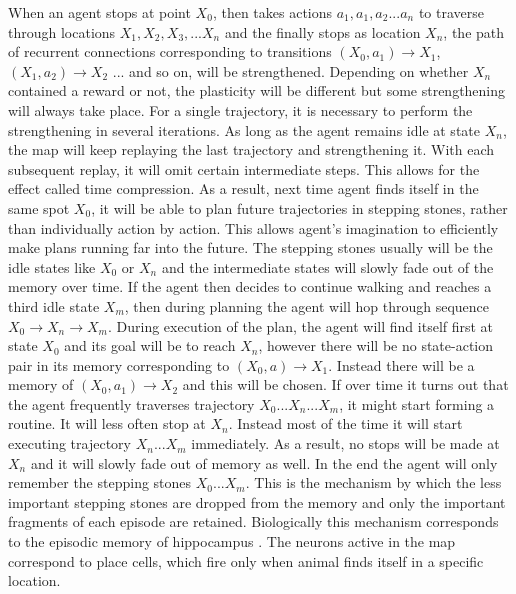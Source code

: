 \documentclass[12pt]{article}
\begin{document}
When an agent stops at point $X_0$, then takes actions $a_1, a_1, a_2... a_n$ to traverse through locations $X_1, X_2, X_3,...X_n$ and the finally stops as location $X_n$, the path of recurrent connections corresponding to transitions  $(X_0,a_1)\rightarrow X_1$, $(X_1,a_2)\rightarrow X_2$ ... and so on, will be strengthened. Depending on whether $X_n$ contained a reward or not, the plasticity will be different but some strengthening will always take place. For a single trajectory, it is necessary to perform the strengthening in several iterations. As long as the agent remains idle at state $X_n$, the map will keep replaying the last trajectory and strengthening it. With each subsequent replay, it will omit certain intermediate steps. This allows for the effect called time compression. As a result, next time agent finds itself in the same spot $X_0$, it will be able to plan future trajectories in stepping stones, rather than individually  action by action. This allows agent's imagination to efficiently make plans running far into the future. The stepping stones usually will be the idle states like $X_0$ or $X_n$ and the intermediate states will slowly fade out of the memory over time. If the agent then decides to continue walking and reaches  a third idle state $X_m$, then during planning the agent will hop through sequence $X_0\rightarrow X_n \rightarrow X_m$. During execution of the plan, the agent will find itself first at state $X_0$ and its goal will be to reach $X_n$, however there will be no state-action pair in its memory corresponding to $(X_0, a)\rightarrow X_1$. Instead there will be a memory of $(X_0,a_1)\rightarrow X_2$ and this will be chosen. If over time it turns out that the agent frequently traverses trajectory $X_0...X_n...X_m$, it might start forming a routine. It will less often stop at $X_n$. Instead most of the time it will start executing trajectory $X_n...X_m$ immediately. As a result, no stops will be made at $X_n$ and it will slowly fade out of memory as well. In the end the agent will only remember  the stepping stones $X_0...X_m$. This is the mechanism by which the less important stepping stones are dropped from the memory and only the important fragments of each episode are retained. Biologically this mechanism corresponds to the episodic memory of hippocampus \cite{Temporal_binding}. The neurons active in the map correspond to place cells, which fire only when animal finds itself in a specific location. 
\end{document}
